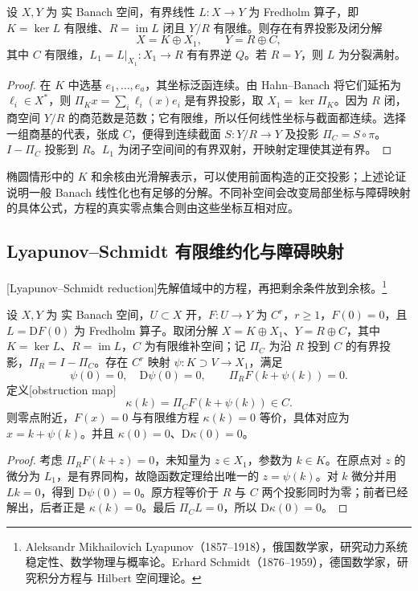 \begin{proposition}\label{g3:prop:banach-fredholm-splitting}
	设 \(X,Y\) 为 实 Banach 空间，有界线性 \(L:X\to Y\) 为 Fredholm 算子，即 \(K=\ker L\) 有限维、\(R=\operatorname{im}L\) 闭且 \(Y/R\) 有限维。则存在有界投影及闭分解
	\[
		X=K\oplus X_1,\qquad Y=R\oplus C,
	\]
	其中 \(C\) 有限维，\(L_1=L|_{X_1}:X_1\to R\) 有有界逆 \(Q\)。若 \(R=Y\)，则 \(L\) 为分裂满射。
\end{proposition}
\begin{proof}
	在 \(K\) 中选基 \(e_1,\ldots,e_a\)，其坐标泛函连续。由 Hahn--Banach 将它们延拓为 \(\ell_i\in X^*\)，则 \(\Pi_Kx=\sum_i\ell_i(x)e_i\) 是有界投影，取 \(X_1=\ker\Pi_K\)。因为 \(R\) 闭，商空间 \(Y/R\) 的商范数是范数；它有限维，所以任何线性坐标与截面都连续。选择一组商基的代表，张成 \(C\)，便得到连续截面 \(S:Y/R\to Y\) 及投影 \(\Pi_C=S\circ\pi\)。\(I-\Pi_C\) 投影到 \(R\)。\(L_1\) 为闭子空间间的有界双射，开映射定理使其逆有界。
\end{proof}

椭圆情形中的 \(K\) 和余核由光滑解表示，可以使用前面构造的正交投影；上述论证说明一般 Banach 线性化也有足够的分解。不同补空间会改变局部坐标与障碍映射的具体公式，方程的真实零点集合则由这些坐标互相对应。

\subsection{Lyapunov–Schmidt 有限维约化与障碍映射}
\label{g3:subsec:1305:05}
[Lyapunov--Schmidt reduction]先解值域中的方程，再把剩余条件放到余核。\footnote{Aleksandr Mikhailovich Lyapunov（1857--1918），俄国数学家，研究动力系统稳定性、数学物理与概率论。Erhard Schmidt（1876--1959），德国数学家，研究积分方程与 Hilbert 空间理论。}

\begin{theorem}\label{g3:thm:lyapunov-schmidt-reduction}
	设 \(X,Y\) 为 实 Banach 空间，\(U\subset X\) 开，\(F:U\to Y\) 为 \(C^r\)，\(r\ge1\)，\(F(0)=0\)，且 \(L=\mathrm DF(0)\) 为 Fredholm 算子。取闭分解 \(X=K\oplus X_1\)、\(Y=R\oplus C\)，其中 \(K=\ker L\)、\(R=\operatorname{im}L\)，\(C\) 为有限维补空间；记 \(\Pi_C\) 为沿 \(R\) 投到 \(C\) 的有界投影，\(\Pi_R=I-\Pi_C\)。存在 \(C^r\) 映射 \(\psi:K\supset V\to X_1\)，满足
	\[
		\psi(0)=0,\quad\mathrm D\psi(0)=0,\qquad
		\Pi_RF(k+\psi(k))=0.
	\]
	定义[obstruction map]
	\[
		\kappa(k)=\Pi_CF(k+\psi(k))\in C.
	\]
	则零点附近，\(F(x)=0\) 与有限维方程 \(\kappa(k)=0\) 等价，具体对应为 \(x=k+\psi(k)\)。并且 \(\kappa(0)=0\)、\(\mathrm D\kappa(0)=0\)。
\end{theorem}
\begin{proof}
	考虑 \(\Pi_RF(k+z)=0\)，未知量为 \(z\in X_1\)，参数为 \(k\in K\)。在原点对 \(z\) 的微分为 \(L_1\)，是有界同构，故隐函数定理给出唯一的 \(z=\psi(k)\)。对 \(k\) 微分并用 \(Lk=0\)，得到 \(\mathrm D\psi(0)=0\)。原方程等价于 \(R\) 与 \(C\) 两个投影同时为零；前者已经解出，后者正是 \(\kappa(k)=0\)。最后 \(\Pi_CL=0\)，所以 \(\mathrm D\kappa(0)=0\)。
\end{proof}

